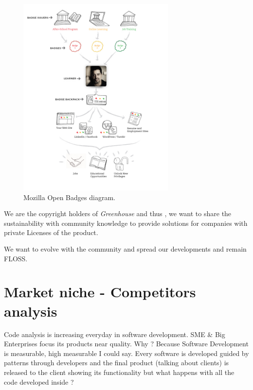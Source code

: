 \documentclass[11pt]{scrartcl}
\begin{document}
\begin{figure}[H]
\centering
\includegraphics[width=0.7\textwidth]{badge-diagram.jpg}
\caption{Mozilla Open Badges diagram.}
\label{open-badges}
\end{figure}


\par We are the copyright holders of \emph{Greenhouse} and thus , we want to share the sustainability with community knowledge to provide solutions for companies with private Licenses of the product.

\par We want to evolve with the community and spread our developments and remain FLOSS.

\section{Market niche - Competitors analysis}
\label{sec:market-niche}

\par Code analysis is increasing everyday in software development. SME \& Big Enterprises focus its products near quality. Why ? Because Software Development is measurable, high measurable I could say. Every software is developed guided by patterns through developers and the final product (talking about clients) is released to the client showing its functionality but what happens with all the code developed inside ?
\end{document}
